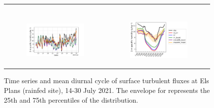 \begin{figure}[hbtp]
\begin{tabular}{cc}
\begin{subfigure}[t]{0.5\textwidth}
        \end{subfigure} \\
        \begin{subfigure}[t]{0.5\textwidth}
            \caption{}
            \includegraphics[width=\textwidth]{images/chap5/SOP_TS_DC/time_series_elsplans_q2m.png}
        \end{subfigure} &
        \begin{subfigure}[t]{0.5\textwidth}
            \caption{}
            \includegraphics[width=\textwidth]{images/chap5/SOP_TS_DC/diurnal_cycle_elsplans_q2m.png}
        \end{subfigure}
    \end{tabular}
    \caption{Time series and mean diurnal cycle of surface turbulent fluxes at Els Plans (rainfed site), 14-30 July 2021. The envelope for \mesomean represents the 25th and 75th percentiles of the distribution.}
    \label{fig:elsplans_surfacevars}
\end{figure}

\hfill

